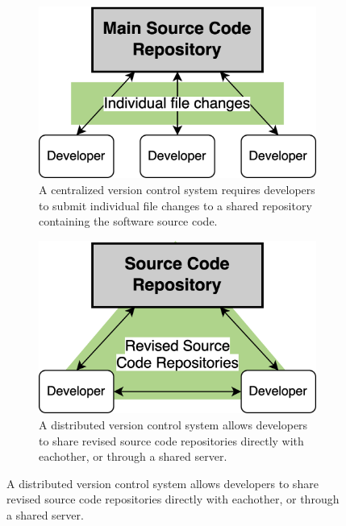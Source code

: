 \documentclass{article}
\begin{document}
\begin{figure}
    \begin{subfigure}[c][][c]{0.45\textwidth}
        \begin{center}
            \includegraphics[width=\textwidth]{png/centralized-vcs.png}
            \caption{
                \centering 
                A centralized version control system requires developers to submit individual file changes to a shared repository containing the software source code.
            }
            \label{fig:centralized-vcs}
        \end{center}
    \end{subfigure}
    \hspace{0.05\textwidth} 
    \begin{subfigure}[c][][c]{0.45\textwidth}
        \begin{center}
            \includegraphics[width=\textwidth]{png/distributed-vcs.png}
            \caption{
                \centering 
                A distributed version control system allows developers to share revised source code repositories directly with eachother, or through a shared server.
            }
            \label{fig:distributed-vcs}
        \end{center}
    \end{subfigure}
    \label{fig:version-control-systems}
\end{figure}
\end{document}
